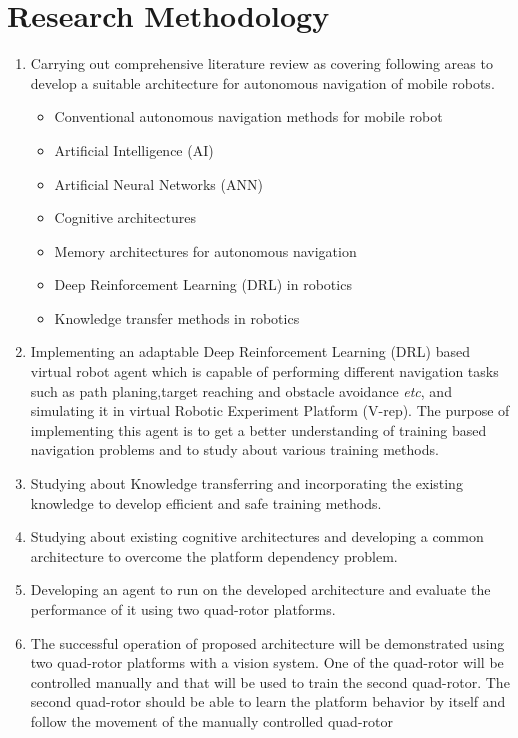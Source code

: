 \documentclass[a4paper,oneside,12pt]{report}
\begin{document}
\chapter{Research Methodology}
\label{ch:research methodology}

\begin{enumerate}
\item Carrying out comprehensive literature review as covering following areas to develop a suitable architecture for autonomous navigation of mobile robots.
	\begin{itemize}
		\item Conventional autonomous navigation methods for mobile robot
		\item Artificial Intelligence (AI)
		\item Artificial Neural Networks (ANN)\cite{R09}
		\item Cognitive architectures
		\item Memory architectures for autonomous navigation
		\item Deep Reinforcement Learning (DRL) in robotics 
		\item Knowledge transfer methods in robotics

	\end{itemize}
	
\item Implementing an adaptable Deep Reinforcement Learning (DRL) based virtual robot agent which is capable of performing different navigation tasks such as path planing,target reaching and obstacle avoidance \textit{etc}, and simulating it in virtual Robotic Experiment Platform (V-rep)\cite{R60}. The purpose of implementing this agent is to get a better understanding of training based navigation problems and to study about various training methods.

\item Studying about Knowledge transferring and incorporating the existing knowledge to develop efficient and safe training methods.

\item Studying about existing cognitive architectures and developing a common architecture to overcome the platform dependency problem.

\item Developing an agent to run on the developed architecture and evaluate the performance of it using two quad-rotor platforms.

\item The successful operation of proposed architecture will be demonstrated using two quad-rotor platforms with a vision system. One of the quad-rotor will be controlled manually and that will be used to train the second quad-rotor. The second quad-rotor should be able to learn the platform behavior by itself and follow the movement of the manually controlled quad-rotor


\end{enumerate}
\end{document}
